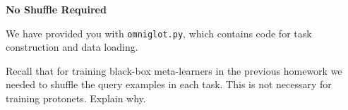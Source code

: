 \item {} {\bf No Shuffle Required}

We have provided you with \texttt{omniglot.py}, which contains code for task construction and data loading.

Recall that for training black-box meta-learners in the previous homework we needed to shuffle the query examples in each task. This is not necessary for training protonets. Explain why.